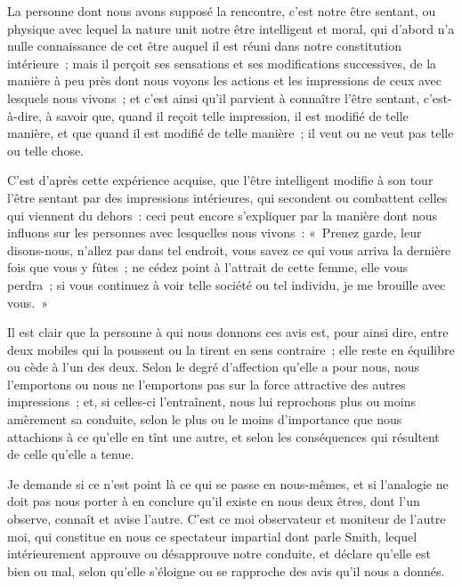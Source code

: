 \documentclass[french,twoside]{book} %
\begin{document}
La personne dont nous avons supposé la rencontre, c’est notre être sentant, ou physique avec lequel la nature unit notre être intelligent et moral, qui d’abord n’a nulle connaissance de cet être auquel il est réuni dans notre constitution intérieure ; mais il perçoit ses sensations et ses modifications successives, de la manière à peu près dont nous voyons les actions et les impressions de ceux avec lesquels nous vivons ; et c’est ainsi qu’il parvient à connaître l’être sentant, c’est-à-dire, à savoir que, quand il reçoit telle impression, il est modifié de telle manière, et que quand il est modifié de telle manière ; il veut ou ne veut pas telle ou telle chose.\par
C’est d’après cette expérience acquise, que l’être intelligent modifie à son tour l’être sentant par des impressions intérieures, qui secondent ou combattent celles qui viennent du dehors : ceci peut encore s’expliquer par la manière dont nous influons sur les personnes avec lesquelles nous vivons : « Prenez garde, leur disons-nous, n’allez pas dans tel endroit, vous savez ce qui vous arriva la dernière fois que vous y fûtes ; ne cédez point à l’attrait de cette femme, elle vous perdra ; si vous continuez à voir telle société ou tel individu, je me brouille avec vous. »\par
Il est clair que la personne à qui nous donnons ces avis est, pour ainsi dire, entre deux mobiles qui la poussent ou la tirent en sens contraire ; elle reste en équilibre ou cède à l’un des deux. Selon le degré d’affection qu’elle a pour nous, nous l’emportons ou nous ne l’emportons pas sur la force attractive des autres impressions ; et, si celles-ci l’entraînent, nous lui reprochons plus ou moins amèrement sa conduite, selon le plus ou le moins d’importance que nous attachions à ce qu’elle en tînt une autre, et selon les conséquences qui résultent de celle qu’elle a tenue.\par
Je demande si ce n’est point là ce qui se passe en nous-mêmes, et si l’analogie ne doit pas nous porter à en conclure qu’il existe en nous deux êtres, dont l’un observe, connaît et avise l’autre. C’est ce moi observateur et moniteur de l’autre moi, qui constitue en nous ce spectateur impartial dont parle Smith, lequel intérieurement approuve ou désapprouve notre conduite, et déclare qu’elle est bien ou mal, selon qu’elle s’éloigne ou se rapproche des avis qu’il nous a donnés.\par
\end{document}

